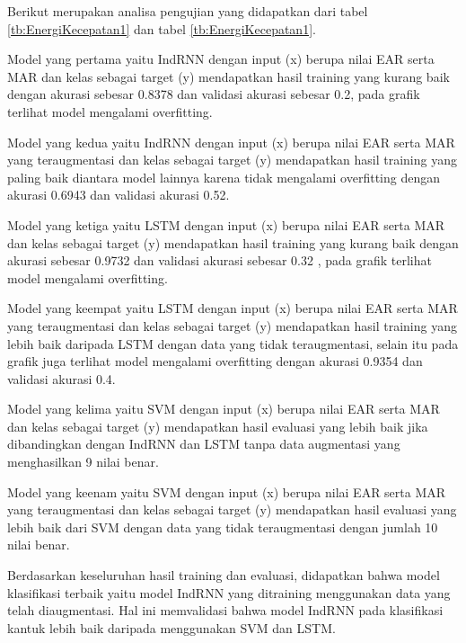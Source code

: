 Berikut merupakan analisa pengujian yang didapatkan dari tabel \ref{tb:EnergiKecepatan1} dan tabel \ref{tb:EnergiKecepatan1}.

Model yang pertama yaitu IndRNN dengan input (x) berupa nilai EAR serta MAR dan kelas
sebagai target (y) mendapatkan hasil training yang kurang baik dengan akurasi sebesar 0.8378 dan validasi akurasi sebesar 0.2,
pada grafik terlihat model mengalami overfitting.

Model yang kedua yaitu IndRNN dengan input (x) berupa nilai EAR serta MAR yang teraugmentasi dan kelas
sebagai target (y) mendapatkan hasil training yang paling baik diantara model lainnya karena tidak mengalami
overfitting dengan akurasi 0.6943 dan validasi akurasi 0.52.

Model yang ketiga yaitu LSTM dengan input (x) berupa nilai EAR serta MAR dan kelas
sebagai target (y) mendapatkan hasil training yang kurang baik dengan akurasi sebesar 0.9732 dan validasi akurasi sebesar 0.32
, pada grafik terlihat model mengalami overfitting.

Model yang keempat yaitu LSTM dengan input (x) berupa nilai EAR serta MAR yang teraugmentasi dan kelas
sebagai target (y) mendapatkan hasil training yang lebih baik daripada LSTM dengan data yang tidak teraugmentasi,
selain itu pada grafik juga terlihat model mengalami overfitting dengan akurasi 0.9354 dan validasi akurasi 0.4.

Model yang kelima yaitu SVM dengan input (x) berupa nilai EAR serta MAR dan kelas
sebagai target (y) mendapatkan hasil evaluasi yang lebih baik jika dibandingkan dengan IndRNN dan LSTM tanpa data
augmentasi yang menghasilkan 9 nilai benar.

Model yang keenam yaitu SVM dengan input (x) berupa nilai EAR serta MAR yang teraugmentasi dan kelas sebagai target
(y) mendapatkan hasil evaluasi yang lebih baik dari SVM dengan data yang tidak teraugmentasi dengan jumlah 10 nilai benar.

Berdasarkan keseluruhan hasil training dan evaluasi, didapatkan bahwa model klasifikasi terbaik yaitu model IndRNN yang
ditraining menggunakan data yang telah diaugmentasi. Hal ini memvalidasi bahwa model IndRNN pada klasifikasi kantuk
lebih baik daripada menggunakan SVM dan LSTM.
